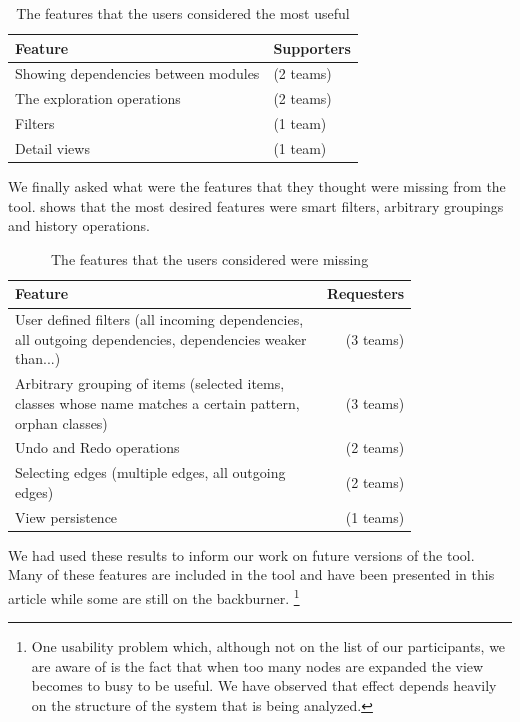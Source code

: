 \documentclass[preprint,12pt]{elsarticle}
\begin{document}
\begin{table}[ht]
\begin{center}
\begin{tabular}{l l}
\footnotesize {Feature} &\footnotesize{ Supporters} \\
\hline
\footnotesize {Showing dependencies between modules} & \footnotesize{(2 teams)} \\
\footnotesize {The exploration operations} &\footnotesize{(2 teams)} \\
\footnotesize {Filters} &\footnotesize{(1 team)} \\
\footnotesize {Detail views} &\footnotesize{(1 team)} \\
\hline
\end{tabular}
\caption{The features that the users considered the most useful}
\label{tab:useful}
\end{center}
\end{table}

We finally asked what were the features that they thought were missing from the tool.  shows that the most desired features were smart filters, arbitrary groupings and history operations.

\begin{table}[ht]
\begin{center}
\begin{tabular}{p{0.8\linewidth} r}
\footnotesize {Feature} &\footnotesize{ Requesters} \\
\hline
\footnotesize {User defined filters (all incoming dependencies, all outgoing dependencies, dependencies weaker than...)} &\footnotesize{ (3 teams)} \\
\footnotesize {Arbitrary grouping of items (selected items, classes whose name matches a certain pattern, orphan classes)} &\footnotesize{ (3 teams)} \\
\footnotesize {Undo and Redo operations} &\footnotesize{ (2 teams)} \\
\footnotesize {Selecting edges (multiple edges, all outgoing edges)} &\footnotesize{ (2 teams)} \\
\footnotesize {View persistence} &\footnotesize{ (1 teams)} \\
\hline

\end{tabular}
\caption{The features that the users considered were missing}
\label{tab:missing}
\end{center}
\end{table}

We had used these results to inform our work on future versions of the tool. Many of these features are included in the tool and have been presented in this article while some are still on the backburner. \footnote{One usability problem which, although not on the list of our participants, we are aware of is the fact that when too many nodes are expanded the view becomes to busy to be useful. We have observed that effect depends heavily on the structure of the system that is being analyzed. }
\end{document}
